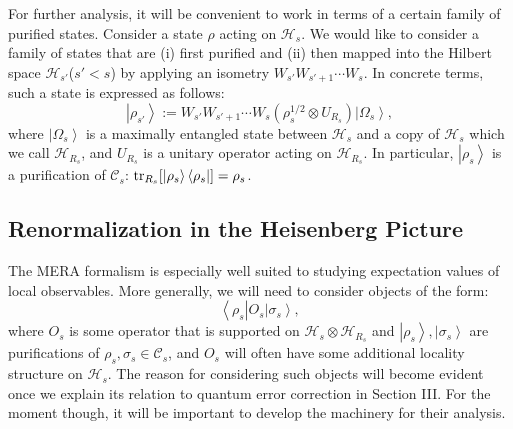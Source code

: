 \documentclass[a4paper,11pt]{article}
\newcommand{\bra}[1]{\left\langle #1 \right|}
\newcommand{\ket}[1]{\left|#1\right\rangle}
\newcommand{\1}{\mathbbm{1}}
\newcommand{\cH}{\mathcal{H}}
\newcommand{\cC}{\mathcal{C}}
\newcommand{\tr}{{\rm tr}}
\newcommand{\mjk}[1]{{\color{green} #1}}
\begin{document}
For further analysis, it will be convenient to work in terms of a certain family of purified states. Consider a state $\rho$ acting on $\mathcal{H}_s$. We would like
to consider a family of states that are (i) first purified and (ii) then mapped into the Hilbert space $\mathcal{H}_{s'}$($s'<s$) by applying an isometry $W_{s'}W_{s'+1}\cdots W_s$.
In concrete terms, such a state is expressed as follows:
\begin{equation}
	\ket{\rho_{s'}}:=W_{s'}W_{s'+1}\cdots W_s(\rho_s^{1/2}\otimes U_{R_s})\ket{\Omega_s},
\end{equation}
where $\ket{\Omega_s}$ is a maximally entangled state between $\mathcal{H}_s$ and a copy of $\cH_s$ which we call $\cH_{R_s}$, and $U_{R_s}$ is a unitary operator acting on $\cH_{R_s}$. In particular, $\ket{\rho_s}$
is  a purification of $\cC_s$: $\tr_{R_s}[\ket{\rho_s}\bra{\rho_s}]=\rho_s$.


\subsection{Renormalization in the Heisenberg Picture}
The MERA formalism is especially well suited to studying expectation values of local observables. More generally, we will need to  consider objects of the form:
\begin{equation}
	\bra{\rho_s} O_s \ket{\sigma_s},\label{eq:mera_object}
\end{equation}
where $O_s$ is some operator that is supported on $\cH_s\otimes\cH_{R_s}$ and $\ket{\rho_s}, \ket{\sigma_s}$ are purifications of $\rho_s,\sigma_s\in \cC_s$, and  $O_s$ will often have some additional locality structure on $\cH_s$. The reason for considering such objects will become evident once we explain its relation to
quantum error correction in Section III. For the moment though, it will be important to develop the machinery for their analysis.
\end{document}
